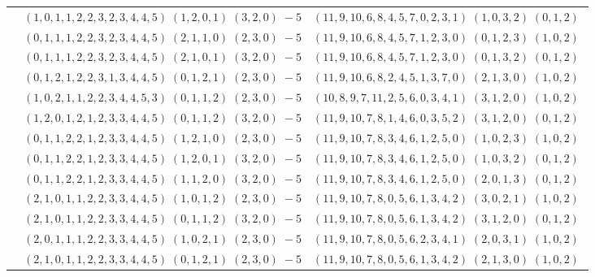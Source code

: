 \documentclass[11pt]{article}
\begin{document}
\begin{longtable}[l]{|c|c|c|}
 \cline{2-3} 
 & $(1 ,0 ,1 ,1 ,2 ,2 ,3 ,2 ,3 ,4 ,4 ,5) \;(1 ,2 ,0 ,1) \;(3 ,2 ,0) \;-5$ & $(11 ,9 ,10 ,6 ,8 ,4 ,5 ,7 ,0 ,2 ,3 ,1) \;(1 ,0 ,3 ,2) \;(0 ,1 ,2) \;$\\ 
 \cline{2-3} 
 & $(0 ,1 ,1 ,1 ,2 ,2 ,3 ,2 ,3 ,4 ,4 ,5) \;(2 ,1 ,1 ,0) \;(2 ,3 ,0) \;-5$ & $(11 ,9 ,10 ,6 ,8 ,4 ,5 ,7 ,1 ,2 ,3 ,0) \;(0 ,1 ,2 ,3) \;(1 ,0 ,2) \;$\\ 
 \cline{2-3} 
 & $(0 ,1 ,1 ,1 ,2 ,2 ,3 ,2 ,3 ,4 ,4 ,5) \;(2 ,1 ,0 ,1) \;(3 ,2 ,0) \;-5$ & $(11 ,9 ,10 ,6 ,8 ,4 ,5 ,7 ,1 ,2 ,3 ,0) \;(0 ,1 ,3 ,2) \;(0 ,1 ,2) \;$\\ 
 \cline{2-3} 
 & $(0 ,1 ,2 ,1 ,2 ,2 ,3 ,1 ,3 ,4 ,4 ,5) \;(0 ,1 ,2 ,1) \;(2 ,3 ,0) \;-5$ & $(11 ,9 ,10 ,6 ,8 ,2 ,4 ,5 ,1 ,3 ,7 ,0) \;(2 ,1 ,3 ,0) \;(1 ,0 ,2) \;$\\ 
 \cline{2-3} 
 & $(1 ,0 ,2 ,1 ,1 ,2 ,2 ,3 ,4 ,4 ,5 ,3) \;(0 ,1 ,1 ,2) \;(2 ,3 ,0) \;-5$ & $(10 ,8 ,9 ,7 ,11 ,2 ,5 ,6 ,0 ,3 ,4 ,1) \;(3 ,1 ,2 ,0) \;(1 ,0 ,2) \;$\\ 
 \cline{2-3} 
 & $(1 ,2 ,0 ,1 ,2 ,1 ,2 ,3 ,3 ,4 ,4 ,5) \;(0 ,1 ,1 ,2) \;(3 ,2 ,0) \;-5$ & $(11 ,9 ,10 ,7 ,8 ,1 ,4 ,6 ,0 ,3 ,5 ,2) \;(3 ,1 ,2 ,0) \;(0 ,1 ,2) \;$\\ 
 \cline{2-3} 
 & $(0 ,1 ,1 ,2 ,2 ,1 ,2 ,3 ,3 ,4 ,4 ,5) \;(1 ,2 ,1 ,0) \;(2 ,3 ,0) \;-5$ & $(11 ,9 ,10 ,7 ,8 ,3 ,4 ,6 ,1 ,2 ,5 ,0) \;(1 ,0 ,2 ,3) \;(1 ,0 ,2) \;$\\ 
 \cline{2-3} 
 & $(0 ,1 ,1 ,2 ,2 ,1 ,2 ,3 ,3 ,4 ,4 ,5) \;(1 ,2 ,0 ,1) \;(3 ,2 ,0) \;-5$ & $(11 ,9 ,10 ,7 ,8 ,3 ,4 ,6 ,1 ,2 ,5 ,0) \;(1 ,0 ,3 ,2) \;(0 ,1 ,2) \;$\\ 
 \cline{2-3} 
 & $(0 ,1 ,1 ,2 ,2 ,1 ,2 ,3 ,3 ,4 ,4 ,5) \;(1 ,1 ,2 ,0) \;(3 ,2 ,0) \;-5$ & $(11 ,9 ,10 ,7 ,8 ,3 ,4 ,6 ,1 ,2 ,5 ,0) \;(2 ,0 ,1 ,3) \;(0 ,1 ,2) \;$\\ 
 \cline{2-3} 
 & $(2 ,1 ,0 ,1 ,1 ,2 ,2 ,3 ,3 ,4 ,4 ,5) \;(1 ,0 ,1 ,2) \;(2 ,3 ,0) \;-5$ & $(11 ,9 ,10 ,7 ,8 ,0 ,5 ,6 ,1 ,3 ,4 ,2) \;(3 ,0 ,2 ,1) \;(1 ,0 ,2) \;$\\ 
 \cline{2-3} 
 & $(2 ,1 ,0 ,1 ,1 ,2 ,2 ,3 ,3 ,4 ,4 ,5) \;(0 ,1 ,1 ,2) \;(3 ,2 ,0) \;-5$ & $(11 ,9 ,10 ,7 ,8 ,0 ,5 ,6 ,1 ,3 ,4 ,2) \;(3 ,1 ,2 ,0) \;(0 ,1 ,2) \;$\\ 
 \cline{2-3} 
 & $(2 ,0 ,1 ,1 ,1 ,2 ,2 ,3 ,3 ,4 ,4 ,5) \;(1 ,0 ,2 ,1) \;(2 ,3 ,0) \;-5$ & $(11 ,9 ,10 ,7 ,8 ,0 ,5 ,6 ,2 ,3 ,4 ,1) \;(2 ,0 ,3 ,1) \;(1 ,0 ,2) \;$\\ 
 \cline{2-3} 
 & $(2 ,1 ,0 ,1 ,1 ,2 ,2 ,3 ,3 ,4 ,4 ,5) \;(0 ,1 ,2 ,1) \;(2 ,3 ,0) \;-5$ & $(11 ,9 ,10 ,7 ,8 ,0 ,5 ,6 ,1 ,3 ,4 ,2) \;(2 ,1 ,3 ,0) \;(1 ,0 ,2) \;$\\ 

\end{longtable}
\end{document}
